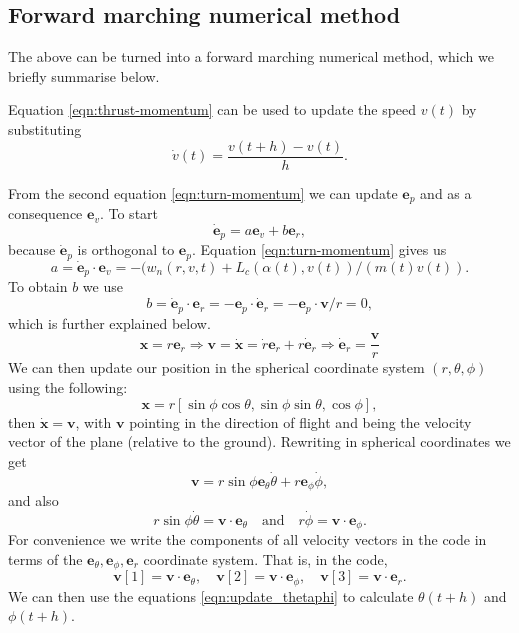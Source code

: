 \documentclass{article}
\renewcommand{\vec}[1]{\boldsymbol{#1}}
\begin{document}
\subsection{Forward marching numerical method}

The above can be turned into a forward marching numerical method, which we briefly summarise below.

Equation \eqref{eqn:thrust-momentum} can be used to update the speed $v(t)$ by substituting
\[
\dot { v}(t) = \frac{{v}(t+h) - {v}(t)}{h}.
\]

From the second equation \eqref{eqn:turn-momentum} we can update $\vec {e}_p$ and as a consequence $\vec e_v$. To start
\[
\dot{\vec e}_p = a {\vec e}_v + b {\vec e}_r, 
\]
because $\dot {\vec e}_p$ is orthogonal to ${\vec e}_p$. Equation \eqref{eqn:turn-momentum} gives us 
\begin{equation}
 a =  \dot{\vec{e}}_p \cdot \vec{e}_v = - (w_n(r,v,t) + L_c(\alpha(t),v(t) ) / (m(t) v(t)).
\end{equation}
To obtain $b$ we use 
\begin{equation}
b = \dot{\vec e}_p \cdot  {\vec e}_r = - {\vec e}_p \cdot  \dot {\vec e}_r =  - {\vec e}_p \cdot  {\vec v} / r = 0,    
\end{equation}
which is further explained below. 
\[
\vec{x}=r{\vec{e}}_r \Rightarrow \vec{v} =\dot{\vec{x}}=\dot{r}{\vec{e}}_r +r \dot{\vec{e}}_r \Rightarrow \dot{\vec{e}}_r=\frac{\vec{v}}{r} 
\]
We can then update our position in the spherical coordinate system $(r,\theta,\phi)$ using the following:
\[
\vec x = r [ \sin \phi \cos \theta, \sin \phi \sin \theta,   \cos \phi], 
\]
then $\dot{\vec x} = \vec v$, with $\vec v$ pointing in the direction of flight and being the velocity vector of the plane (relative to the ground). Rewriting in spherical coordinates we get
\[
\vec v = r \sin \phi  {\vec e_\theta} \dot \theta + r  {\vec e_\phi} \dot \phi, 
\]
 and also
\begin{equation} \label{eqn:update_thetaphi}
    r \sin \phi \dot \theta = \vec v \cdot {\vec e}_\theta  \quad \text{and} \quad 
r \dot \phi = \vec v \cdot {\vec e}_\phi.
\end{equation}
For convenience we write the components of all  velocity vectors in the code in terms of the ${\vec e}_\theta, {\vec e}_\phi, {\vec e}_r$ coordinate system. That is, in the code, 
\[
\vec v[1] = \vec v \cdot {\vec e}_\theta, \quad 
\vec v[2] = \vec v \cdot {\vec e}_\phi, 
\quad 
\vec v[3] = \vec v \cdot {\vec e}_r.
\]
We can then use the equations \eqref{eqn:update_thetaphi}  to calculate $\theta(t+h)$ and $\phi(t+h)$. 
\end{document}
